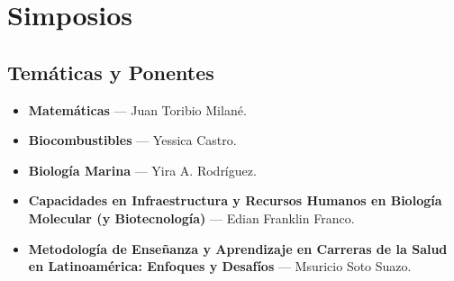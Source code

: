 \documentclass[11pt,a4paper]{article}
\begin{document}
\section{Simposios}

\subsection{Temáticas y Ponentes}
\begin{itemize}[leftmargin=*, label={--}]
    \item \textbf{Matemáticas} --- Juan Toribio Milané.
    \item \textbf{Biocombustibles} --- Yessica Castro.
    \item \textbf{Biología Marina} --- Yira A. Rodríguez.
    \item \textbf{Capacidades en Infraestructura y Recursos Humanos en Biología Molecular (y Biotecnología)} --- Edian Franklin Franco.
    \item \textbf{Metodología de Enseñanza y Aprendizaje en Carreras de la Salud en Latinoamérica: Enfoques y Desafíos} --- Msuricio Soto Suazo.
\end{itemize}
\end{document}

